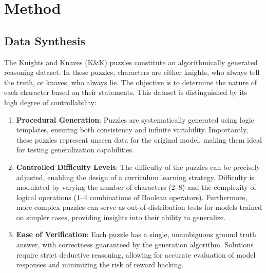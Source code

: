 \section{Method}
\subsection{Data Synthesis}

The Knights and Knaves (K\&K) puzzles \cite{memllm} constitute an algorithmically generated reasoning dataset. In these puzzles, characters are either knights, who always tell the truth, or knaves, who always lie. The objective is to determine the nature of each character based on their statements. This dataset is distinguished by its high degree of controllability:

\begin{enumerate}[leftmargin=*]
    \item \textbf{Procedural Generation}: Puzzles are systematically generated using logic templates, ensuring both consistency and infinite variability. Importantly, these puzzles represent unseen data for the original model, making them ideal for testing generalization capabilities.
    
    \item \textbf{Controlled Difficulty Levels}: The difficulty of the puzzles can be precisely adjusted, enabling the design of a curriculum learning strategy. Difficulty is modulated by varying the number of characters (2–8) and the complexity of logical operations (1–4 combinations of Boolean operators). Furthermore, more complex puzzles can serve as out-of-distribution tests for models trained on simpler cases, providing insights into their ability to generalize.

    \item \textbf{Ease of Verification}: Each puzzle has a single, unambiguous ground truth answer, with correctness guaranteed by the generation algorithm. Solutions require strict deductive reasoning, allowing for accurate evaluation of model responses and minimizing the risk of reward hacking.
\end{enumerate}



